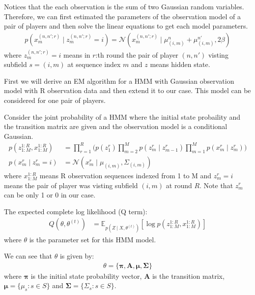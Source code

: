 \documentclass[12pt]{article}
\newenvironment{problem}[2][Problem]{\begin{trivlist}
\item[\hskip \labelsep {\bfseries #1}\hskip \labelsep {\bfseries #2.}]}{\end{trivlist}}
\begin{document}
\pagebreak
\begin{problem}{2.6.18}
Notices that the each observation is the sum of two Gaussian random variables.
Therefore, we can first estimated the parameters of the observation model of 
a pair of players and then solve the linear equations to get each model parameters.
\begin{align*}
    p(x_m^{(n,n';r)}\mid z_m^{(n,n';r)} = i) = \mathcal{N}(x_m^{(n,n';r)} 
            \mid \mu^{n}_{(i,m)} + \mu^{n'}_{(i,m)}, 2\beta)
\end{align*}
where $z_m^{(n,n';r)} = i$ means in $r$:th round the pair of player $(n, n')$ visting 
subfield $s = (i, m)$ at sequence index $m$ and $z$ means hidden state.

First we will derive an EM algorithm for a HMM with Gaussian observation model 
with R observation data and then extend it to our case. This model can be considered
for one pair of players.

Consider the joint probability of a HMM where the initial state probaility and 
the transition matrix are given and the observation model is a conditional
Gaussian.
\begin{align*}
    p(z^{1:R}_{1:M}, x^{1:R}_{1:M}) &= \prod_{r=1}^{R} \biggl(
            p(z^r_1) \prod_{m=2}^{M}p(z^r_m\mid z^r_{m-1})
            \prod_{m=1}^{M}p(x^r_m\mid z^r_m) \biggl)\\
    p(x^r_m\mid z^r_m= i) &= \mathcal{N}(x^r_m \mid \mu_{(i,m)}, \Sigma_{(i,m)})
\end{align*}
where $x^{1:R}_{1:M}$ means R observation sequences indexed from 1 to M and
$z^r_m= i$ means the pair of player was visting subfield $(i, m)$ at round $R$.
Note that $z^r_m$ can be only 1 or 0 in our case.

The expected complete log likelihood (Q term):
\begin{align*}
    Q(\theta, \theta^{(t)}) &= \mathbb{E}_{p(Z\mid X, \theta^{(t)})}[
        \log p(z^{1:R}_{1:M}, x^{1:R}_{1:M})]
\end{align*}
where $\theta$ is the parameter set for this HMM model.

We can see that $\theta$ is given by:
\begin{align*}
    \theta = \{\bm{\pi}, \bm{A}, \bm{\mu}, \bm{\Sigma}\}
\end{align*}
where $\bm{\pi}$ is the initial state probability vector, $\bm{A}$ is the transition
matrix, $\bm{\mu} = \{ \mu_s: s \in S\}$ and $\bm{\Sigma} = \{ \Sigma_s: s \in S\}$.


\end{problem}
\end{document}
